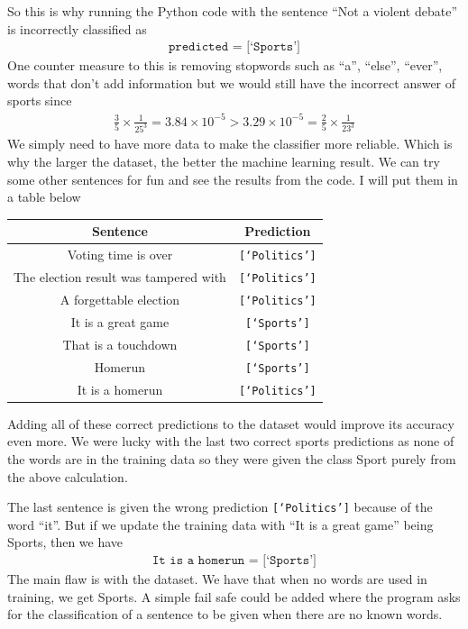 \documentclass[12pt,twoside]{report}   %
\begin{document}
So this is why running the Python code with the sentence ``Not a violent debate'' is incorrectly classified as
\begin{align*}
\texttt{predicted = [`Sports']}
\end{align*}
One counter measure to this is removing stopwords such as ``a'', ``else'', ``ever'', words that don't add information but we would still have the incorrect answer of sports since
\begin{align*}
\frac{3}{5}\times\frac{1}{25^3} = 3.84\times10^{-5} > 3.29\times10^{-5} = \frac{2}{5}\times\frac{1}{23^3}
\end{align*}
We simply need to have more data to make the classifier more reliable. Which is why the larger the dataset, the better the machine learning result. We can try some other sentences for fun and see the results from the code. I will put them in a table below
\begin{table}[H]
  \centering
  \begin{tabular}{|c|c|}
    \hline
    Sentence & Prediction\\
\hline
Voting time is over & \texttt{[`Politics']}\\
The election result was tampered with & \texttt{[`Politics']}\\
A forgettable election & \texttt{[`Politics']}\\
It is a great game & \texttt{[`Sports']}\\
That is a touchdown & \texttt{[`Sports']}\\
Homerun & \texttt{[`Sports']}\\
\hline
It is a homerun & \texttt{[`Politics']}\\
\hline
  \end{tabular}
\end{table}
Adding all of these correct predictions to the dataset would improve its accuracy even more. We were lucky with the last two correct sports predictions as none of the words are in the training data so they were given the class Sport purely from the above calculation.

The last sentence is given the wrong prediction \colorbox{codegrey}{\texttt{[`Politics']}} because of the word ``it''. But if we update the training data with ``It is a great game'' being Sports, then we have
\begin{align*}
\texttt{It is a homerun = [`Sports']}
\end{align*}
The main flaw is with the dataset. We have that when no words are used in training, we get Sports. A simple fail safe could be added where the program asks for the classification of a sentence to be given when there are no known words.
\end{document}
